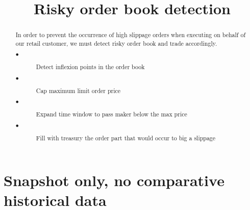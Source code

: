 \documentclass[conference]{IEEEtran}
\begin{document}
\title{Risky order book detection}

\author{
}

\maketitle

\begin{abstract}
In order to prevent the occurrence of high slippage orders when executing on behalf of our retail customer, we must detect risky order book and trade accordingly.
\begin{description}
  \item[$\bullet$]Detect inflexion points in the order book
  \item[$\bullet$]Cap maximum limit order price
  \item[$\bullet$]Expand time window to pass maker below the max price
  \item[$\bullet$]Fill with treasury the order part that would occur to big a slippage
\end{description}

\end{abstract}
\section{Snapshot only, no comparative historical data}
\end{document}
